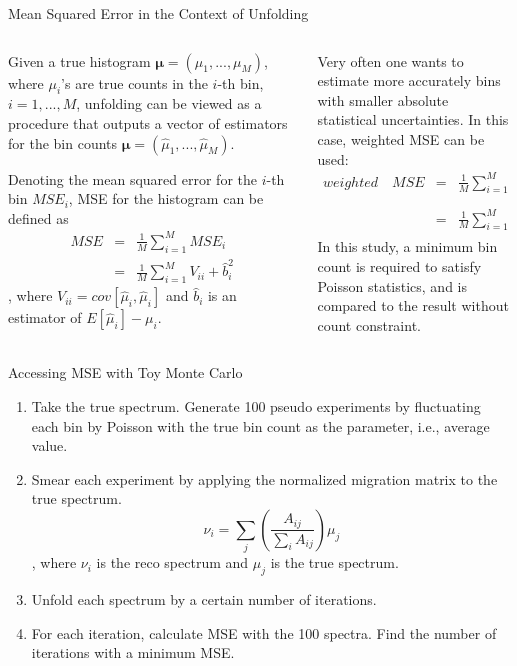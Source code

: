 \documentclass[aspectratio=169]{beamer}
\begin{document}
\begin{frame}{Mean Squared Error in the Context of Unfolding}
  \begin{columns}
    \begin{column}{.5\textwidth}
      \footnotesize
				Given a true histogram $\pmb{\mu}=(\mu_1,...,\mu_M)$, where $\mu_i$'s are true counts in the $i$-th bin, $i=1,...,M$, unfolding can be viewed as a procedure that outputs a vector of estimators for the bin counts $\pmb{\hat{\mu}}=(\hat{\mu}_1,...,\hat{\mu}_M)$.
				
				Denoting the mean squared error for the $i$-th bin $MSE_i$, MSE for the histogram can be defined as
				\begin{eqnarray}
				  MSE &=& \frac{1}{M}\sum_{i=1}^M MSE_i \nonumber\\
				  &=& \frac{1}{M}\sum_{i=1}^M V_{ii}+\hat{b}_i^2
				\end{eqnarray}
				, where $V_{ii}=cov[\hat{\mu}_i,\hat{\mu}_i]$ and $\hat{b}_i$ is an estimator of $E[\hat{\mu}_i]-\mu_i$.
    \end{column}
    \begin{column}{.5\textwidth}
      \footnotesize
			Very often one wants to estimate more accurately bins with smaller absolute statistical uncertainties. In this case, weighted MSE can be used:
			\begin{eqnarray}
			  weighted \quad MSE &=& \frac{1}{M}\sum_{i=1}^M \frac{MSE_i}{\hat{\mu}_i} \nonumber\\
			  &=& \frac{1}{M}\sum_{i=1}^M \frac{V_{ii}+\hat{b}_i^2}{\hat{\mu}_i}
			\end{eqnarray}
			In this study, a minimum bin count is required to satisfy Poisson statistics, and is compared to the result without count constraint.
		\end{column}
	\end{columns}
\end{frame}

\begin{frame}{Accessing MSE with Toy Monte Carlo}
  \begin{enumerate}
    \item Take the true spectrum. Generate 100 pseudo experiments by fluctuating each bin by Poisson with the true bin count as the parameter, i.e., average value.
    \item Smear each experiment by applying the normalized migration matrix to the true spectrum.
      \begin{equation}
        \nu_i=\sum_j\left(\frac{A_{ij}}{\sum_i A_{ij}}\right)\mu_j
      \end{equation}
      , where $\nu_i$ is the reco spectrum and $\mu_j$ is the true spectrum.
    \item Unfold each spectrum by a certain number of iterations.
    \item For each iteration, calculate MSE with the 100 spectra. Find the number of iterations with a minimum MSE.
  \end{enumerate}
\end{frame}
\end{document}
